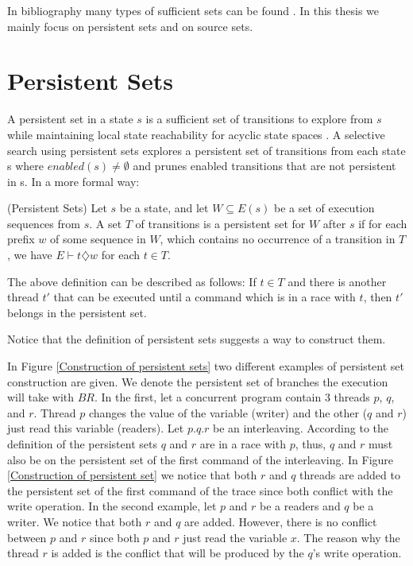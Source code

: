 In bibliography many types of sufficient sets can be found \cite{Godefroid1996}. 
In this thesis we mainly focus on persistent sets and on source sets.


\section{Persistent Sets}

A persistent set in a state $s$ is a sufficient set of transitions to
explore from $s$ while maintaining local state reachability for acyclic state spaces \cite{God97}. A selective search using persistent
sets explores a persistent set of transitions from each state s where $enabled(s) \neq \emptyset$ and prunes enabled transitions that
are not persistent in s.
In a more formal way:\\

\begin{definition}{(Persistent Sets)}
Let $s$ be a state, and let $W \subseteq E(s)$ be a set
of execution sequences from $s$. A set $T$ of transitions is a persistent set for $W$
after $s$ if for each prefix $w$ of some sequence in $W$, which contains no occurrence
of a transition in $T$,  we have $E \vdash t \diamondsuit w$ for each $t \in T$.
\end{definition}

The above definition can be described as follows: If $t \in T$ and there is another thread $t'$ that can be executed until a command which
is in a race with $t$, then $t'$ belongs in the persistent set.

Notice that the definition of persistent sets suggests a way to construct them.

In Figure \ref{Construction of persistent sets} two different examples of persistent set construction are given. We denote the persistent set of branches the execution will take with $BR{}$.
In the first, let a concurrent program contain 3 threads $p$, $q$, and $r$. Thread $p$ changes the value of the variable (writer) and the other ($q$ and $r$) just read this variable (readers).
Let $p.q.r$ be an interleaving. According to the definition of the persistent sets $q$ and $r$ are in a race with $p$, thus, $q$ and $r$ must also be on the persistent set
of the first command of the interleaving. In Figure \ref{Construction of persistent set} we notice that both $r$ and $q$ threads are added to the persistent set of the first
command of the trace since both conflict with the write operation. 
In the second example, let $p$ and $r$  be a readers and $q$ be a writer. We notice that both $r$ and $q$ are added. However, there is no conflict between $p$ and $r$ since both $p$ and $r$
just read the variable $x$. The reason why the thread $r$ is added is the conflict that will be produced by the $q$'s write operation.

